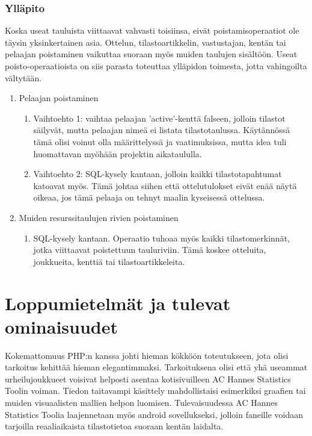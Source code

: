 \documentclass[12pt]{article} %
\begin{document}
\subsubsection{Ylläpito}
Koska useat tauluista viittaavat vahvasti toisiinsa, eivät poistamisoperaatiot ole täysin yksinkertainen asia. Ottelun, tilastoartikkelin, vastustajan, kentän tai pelaajan poistaminen vaikuttaa suoraan myös muiden taulujen sisältöön. Useat poisto-operaatioista on siis parasta toteuttaa ylläpidon toimesta, jotta vahingoilta vältytään.
\begin{enumerate}
	\item
		Pelaajan poistaminen
		\begin{enumerate}
			\item  Vaihtoehto 1: vaihtaa pelaajan 'active'-kenttä falseen, jolloin tilastot säilyvät, mutta pelaajan nimeä ei listata tilastotaulussa. Käytännössä tämä olisi voinut olla määrittelyssä ja vaatimuksissa, mutta idea tuli huomattavan myöhään projektin aikataululla.
			\item Vaihtoehto 2: SQL-kysely kantaan, jolloin kaikki tilastotapahtumat katoavat myös. Tämä johtaa siihen että ottelutulokset eivät enää näytä oikeaa, jos tämä pelaaja on tehnyt maalin kyseisessä ottelussa.
		\end{enumerate}
	\item
		Muiden resurssitaulujen rivien poistaminen
		\begin{enumerate}
			\item SQL-kysely kantaan. Operaatio tuhoaa myös kaikki tilastomerkinnät, jotka viittaavat poistettuun tauluriviin. Tämä koskee otteluita, joukkueita, kenttiä tai tilastoartikkeleita.
		\end{enumerate}
\end{enumerate}

\section{Loppumietelmät ja tulevat ominaisuudet} %
Kokemattomuus PHP:n kanssa johti hieman kökköön toteutukseen, jota olisi tarkoitus kehittää hieman elegantimmaksi. Tarkoituksena olisi että yhä useammat urheilujoukkueet voisivat helposti asentaa kotisivuilleen AC Hannes Statistics Toolin voiman. Tiedon taitavampi käsittely mahdollistaisi esimerkiksi graafien tai muiden visuaalisten mallien helpon luomisen. Tulevaisuudessa AC Hannes Statistics Toolia laajennetaan myös android sovellukseksi, jolloin faneille voidaan tarjoilla reaaliaikaista tilastotietoa suoraan kentän laidalta.


\begin{thebibliography}{99} %
\end{thebibliography}

\end{document}
